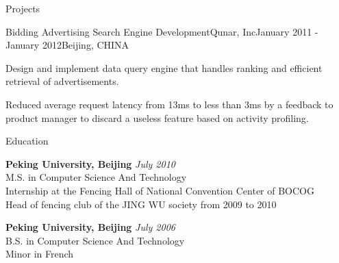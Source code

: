 \documentclass{resume} %
\begin{document}
\begin{rSection}{Projects}
\begin{rSubsection}{Bidding Advertising Search Engine
    Development}{Qunar, Inc}{January 2011 -
    January 2012}{Beijing, CHINA}
\item Design and implement data query engine that handles ranking and efficient retrieval of advertisements.
\item Reduced average request latency from 13ms to less than 3ms by a feedback to product manager to discard a useless 
feature based on activity profiling. 
\end{rSubsection}

\end{rSection}


\begin{rSection}{Education}

{\bf Peking University, Beijing} \hfill {\em July 2010} \\ 
M.S. in Computer Science And Technology \\
Internship at the Fencing Hall of National Convention Center of BOCOG \\
Head of fencing club of the JING WU society from 2009 to 2010 

{\bf Peking University, Beijing} \hfill {\em July 2006} \\ 
B.S. in Computer Science And Technology \\
Minor in French

\end{rSection}






\end{document}

